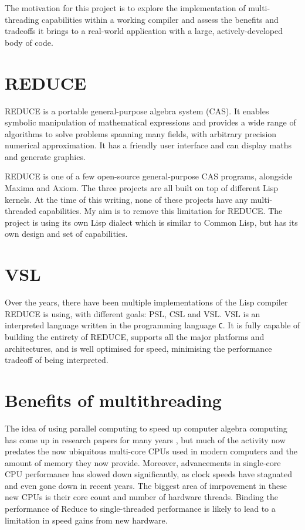 The motivation for this project is to explore the implementation of multi-threading
capabilities within a working compiler and assess the benefits and tradeoffs it brings
to a real-world application with a large, actively-developed body of code.

\section{REDUCE}

REDUCE \cite{reduce} is a portable general-purpose algebra system (CAS). It enables symbolic
manipulation of mathematical expressions and provides a wide range of algorithms
to solve problems spanning many fields, with arbitrary precision numerical approximation.
It has a friendly user interface and can display maths and generate graphics.

REDUCE is one of a few open-source general-purpose CAS programs, alongside Maxima and Axiom.
The three projects are all built on top of different Lisp kernels. At the time of this writing,
none of these projects have any multi-threaded capabilities. My aim is to remove this limitation
for REDUCE. The project is using its own Lisp dialect which is similar to Common Lisp, but has its
own design and set of capabilities.

\section{VSL}

Over the years, there have been multiple implementations of the Lisp compiler REDUCE is using, with
different goals: PSL, CSL and VSL. VSL is an interpreted language written in the programming
language \texttt{C}. It is fully capable of building the entirety of REDUCE, supports all the major
platforms and architectures, and is well optimised for speed, minimising the performance tradeoff
of being interpreted.

\section{Benefits of multithreading}

The idea of using parallel computing to speed up computer algebra computing has come
up in research papers for many years \cite{multithreading}, but much of the activity now
predates the now ubiquitous multi-core CPUs used in modern computers and the amount of memory
they now provide. Moreover, advancements in single-core CPU performance has slowed down
significantly, as clock speeds have stagnated and even gone down in recent years. The biggest
area of imrpovement in these new CPUs is their core count and number of hardware threads.
Binding the performance of Reduce to single-threaded performance is likely to lead to
a limitation in speed gains from new hardware.

